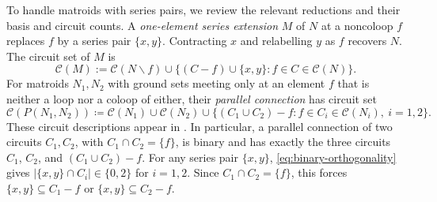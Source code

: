\documentclass[10pt,a4paper]{article}
\numberwithin{equation}{section}
\newcommand{\CC}{\mathcal C}
\begin{document}
To handle matroids with series pairs, we review the relevant
reductions and their basis and circuit counts.
A \emph{one-element series extension} \(M\) of \(N\) at a noncoloop
\(f\) replaces \(f\) by a series pair \(\{x,y\}\). Contracting \(x\)
and relabelling \(y\) as \(f\) recovers \(N\). The circuit set of \(M\) is
\begin{equation}\label{eq:series-circuits}
 \CC(M):=\CC(N\backslash f)\cup
 \{(C-f)\cup\{x,y\}:f\in C\in\CC(N)\}.
\end{equation}
For matroids \(N_1,N_2\) with ground sets meeting only at an
element \(f\) that is neither a loop nor a coloop of either,
their \emph{parallel connection} has circuit set
\begin{equation}\label{eq:parallel-circuits}
 \CC(P(N_1,N_2))\coloneqq\CC(N_1)\cup\CC(N_2)\cup
 \{(C_1\cup C_2)-f:f\in C_i\in\CC(N_i),\ i=1,2\}.
\end{equation}
These circuit descriptions appear in \cite[Section~7.1]{Oxley2011}.
In particular, a parallel connection of two circuits \(C_1,C_2\),
with \(C_1\cap C_2=\{f\}\), is binary
\cite[Proposition~7.1.24]{Oxley2011} and has exactly the three circuits
\(C_1\), \(C_2\), and \((C_1\cup C_2)-f\).
For any series pair \(\{x,y\}\), \eqref{eq:binary-orthogonality} gives
\(|\{x,y\}\cap C_i|\in\{0,2\}\) for \(i=1,2\).
Since \(C_1\cap C_2=\{f\}\), this forces
\(\{x,y\}\subseteq C_1-f\) or \(\{x,y\}\subseteq C_2-f\).
\end{document}
